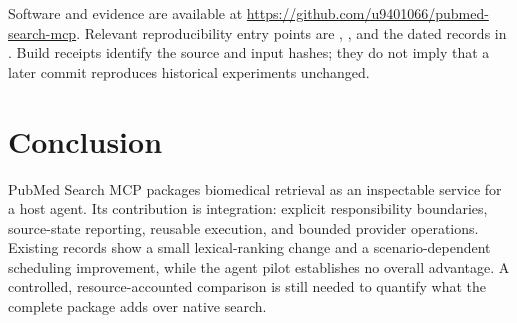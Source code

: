\documentclass[11pt]{article}
\begin{document}
Software and evidence are available at
\url{https://github.com/u9401066/pubmed-search-mcp}. Relevant reproducibility
entry points are ,
, and the dated records in
. Build receipts identify the source and input hashes;
they do not imply that a later commit reproduces historical experiments unchanged.

\section{Conclusion}
PubMed Search MCP packages biomedical retrieval as an inspectable service for a
host agent. Its contribution is integration: explicit responsibility boundaries,
source-state reporting, reusable execution, and bounded provider operations.
Existing records show a small lexical-ranking change and a scenario-dependent
scheduling improvement, while the agent pilot establishes no overall advantage.
A controlled, resource-accounted comparison is still needed to quantify what the
complete package adds over native search.



\end{document}
